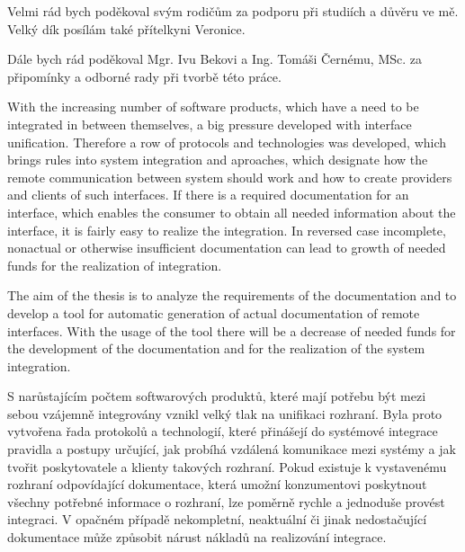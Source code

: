 \documentclass[11pt,twoside,a4paper]{book}
\begin{document}

\coverpagestarts


\acknowledgements
\noindent
Velmi rád bych poděkoval svým rodičům za podporu při studiích a důvěru ve mě.
Velký dík posílám také přítelkyni Veronice. 

Dále bych rád poděkoval Mgr.
Ivu Bekovi a Ing. Tomáši Černému, MSc. za připomínky a odborné rady při tvorbě
této práce.





 
\abstractpage

With the increasing number of software products, which have a need to be
integrated in between themselves, a big pressure developed with interface
unification. Therefore a row of protocols and technologies was developed, which
brings rules into system integration and aproaches, which designate how the
remote communication between system should work and how to create providers and
clients of such interfaces.
If there is a required documentation for an interface, which enables the
consumer to obtain all needed information about the interface, it is fairly easy
to realize the integration. In reversed case incomplete, nonactual or otherwise
insufficient documentation can lead to growth of needed funds for the
realization of integration.

The aim of the thesis is to analyze the requirements of the documentation and to
develop a tool for automatic generation of actual documentation of remote
interfaces. With the usage of the tool there will be a decrease of needed funds
for the development of the documentation and for the realization of the system
integration.


\baselineskip
S narůstajícím počtem softwarových produktů, které mají potřebu být mezi sebou vzájemně
integrovány vznikl velký tlak na unifikaci rozhraní. Byla proto vytvořena řada protokolů a
technologií, které přinášejí do systémové integrace pravidla a postupy určující,
jak probíhá vzdálená komunikace mezi systémy a jak tvořit poskytovatele a klienty takových rozhraní.
Pokud existuje k vystavenému rozhraní odpovídající dokumentace, která umožní
konzumentovi poskytnout všechny potřebné informace o rozhraní, lze poměrně rychle a
jednoduše provést integraci. V opačném případě nekompletní, neaktuální či jinak
nedostačující dokumentace může způsobit nárust nákladů na realizování integrace.
\end{document}
